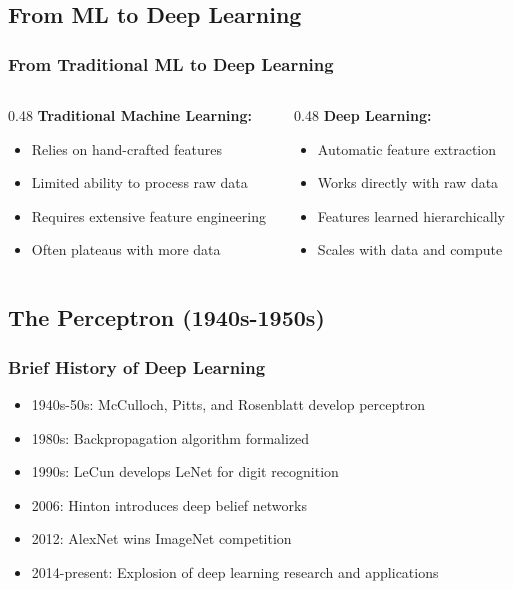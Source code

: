 \documentclass[5pt,aspectratio=169]{beamer}
\begin{document}
\subsection{From ML to Deep Learning}
\begin{frame}
\frametitle{From Traditional ML to Deep Learning}
\begin{columns}
\begin{column}{0.48\textwidth}
\textbf{Traditional Machine Learning:}
\begin{itemize}
    \item Relies on hand-crafted features
    \item Limited ability to process raw data
    \item Requires extensive feature engineering
    \item Often plateaus with more data
\end{itemize}
\end{column}
\begin{column}{0.48\textwidth}
\textbf{Deep Learning:}
\begin{itemize}
    \item Automatic feature extraction
    \item Works directly with raw data
    \item Features learned hierarchically
    \item Scales with data and compute
\end{itemize}
\end{column}
\end{columns}
\end{frame}

\subsection{The Perceptron (1940s-1950s)}

\begin{frame}
\frametitle{Brief History of Deep Learning}
\begin{itemize}
    \item 1940s-50s: McCulloch, Pitts, and Rosenblatt develop perceptron
    \item 1980s: Backpropagation algorithm formalized
    \item 1990s: LeCun develops LeNet for digit recognition
    \item 2006: Hinton introduces deep belief networks
    \item 2012: AlexNet wins ImageNet competition
    \item 2014-present: Explosion of deep learning research and applications
\end{itemize}
\end{frame}
\end{document}
